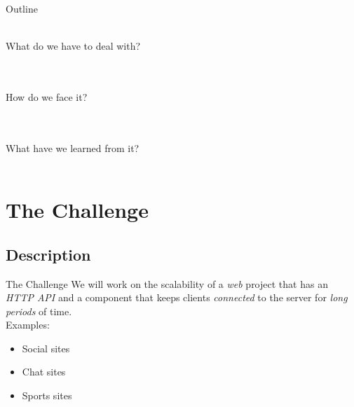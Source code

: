 \documentclass[utf8]{beamer}
\begin{document}
\begin{frame}[t]
{\begin{center}
		\end{center}
	}
\end{frame}

\begin{frame}{Outline}
	\begin{description}
		\item<+->[The Challenge] {\ \\ What do we have to deal with? \\ \ }
		\item<+->[The Plan] {\ \\ How do we face it? \\ \  }
		\item<+->[The Tips and Tricks] {\ \\ What have we learned from it? \\ \ }
	\end{description}
\end{frame}

\section{The Challenge}
\subsection{Description}
\begin{frame}{The Challenge}
	We will work on the scalability of a \emph{web} project \pause that has an \emph{HTTP API} \pause and a component that keeps clients \emph{connected} to the server \pause for \emph{long periods} of time.\\
\pause Examples:
	\begin{itemize}
		\item Social sites
		\item Chat sites
		\item Sports sites
	\end{itemize}
\end{frame}
\end{document}
